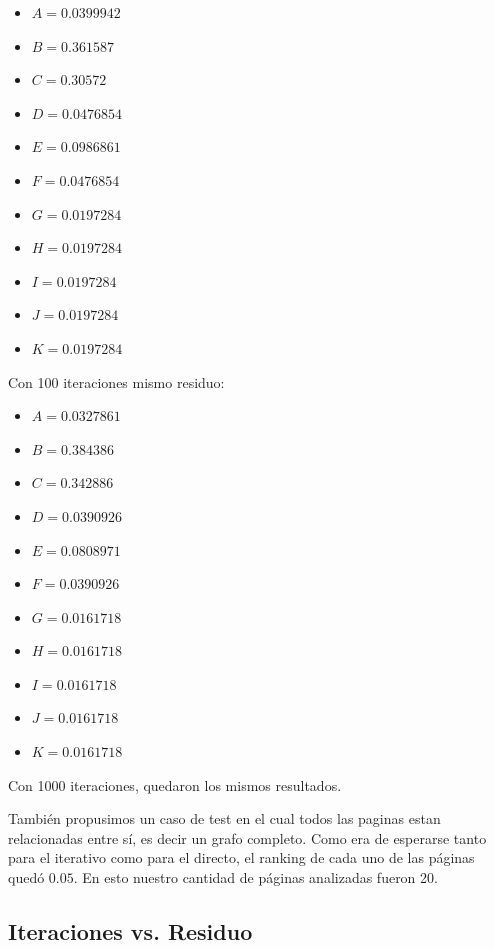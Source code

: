 \begin{itemize}
        \begin{itemize}
            \item $A = 0.0399942$
            \item $B = 0.361587$
            \item $C = 0.30572$
            \item $D = 0.0476854$
            \item $E = 0.0986861$
            \item $F = 0.0476854$
            \item $G = 0.0197284$
            \item $H = 0.0197284$
            \item $I = 0.0197284$
            \item $J = 0.0197284$
            \item $K = 0.0197284$
        \end{itemize}

        Con 100 iteraciones mismo residuo:
        \begin{itemize}
            \item $A = 0.0327861$
            \item $B = 0.384386$
            \item $C = 0.342886$
            \item $D = 0.0390926$
            \item $E = 0.0808971$
            \item $F = 0.0390926$
            \item $G = 0.0161718$
            \item $H = 0.0161718$
            \item $I = 0.0161718$
            \item $J = 0.0161718$
            \item $K = 0.0161718$
        \end{itemize}

        Con 1000 iteraciones, quedaron los mismos resultados.
\end{itemize}

También propusimos un caso de test en el cual todos las paginas estan relacionadas entre sí, es decir un grafo completo. Como era de esperarse tanto para el iterativo como para el directo, el ranking de cada uno de las páginas quedó $0.05$. En esto nuestro cantidad de páginas analizadas fueron 20.

\subsection{Iteraciones vs. Residuo}

